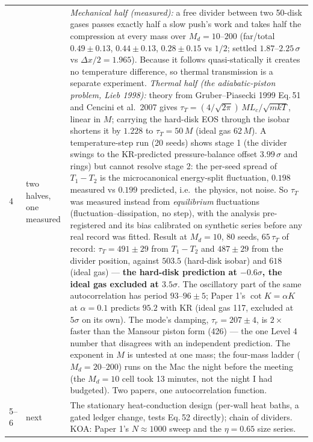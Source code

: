\documentclass[11pt,a4paper]{article}
\begin{document}
\begin{center}
\begin{tabular}{@{}lp{3.4cm}p{9.2cm}@{}}
4 & two halves, one measured & \emph{Mechanical half (measured):} a free divider between two 50-disk gases passes exactly half a slow push's work and takes half the compression at every mass over $M_d = 10$--$200$ (far/total $0.49 \pm 0.13$, $0.44 \pm 0.13$, $0.28 \pm 0.15$ vs $1/2$; settled $1.87$--$2.25\,\sigma$ vs $\Delta x/2 = 1.965$). Because it follows quasi-statically it creates no temperature difference, so thermal transmission is a separate experiment. \emph{Thermal half (the adiabatic-piston problem, Lieb 1998):} theory from Gruber--Piasecki 1999 Eq.\,51 and Cencini et al.\ 2007 gives $\tau_T = (4/\sqrt{2\pi})\,ML_c/\sqrt{mkT}$, linear in $M$; carrying the hard-disk EOS through the isobar shortens it by $1.228$ to $\tau_T = 50\,M$ (ideal gas $62\,M$). A temperature-step run (20 seeds) shows stage 1 (the divider swings to the KR-predicted pressure-balance offset $3.99\,\sigma$ and rings) but cannot resolve stage 2: the per-seed spread of $T_1 - T_2$ is the microcanonical energy-split fluctuation, $0.198$ measured vs $0.199$ predicted, i.e.\ the physics, not noise. So $\tau_T$ was measured instead from \emph{equilibrium} fluctuations (fluctuation--dissipation, no step), with the analysis pre-registered and its bias calibrated on synthetic series before any real record was fitted. Result at $M_d = 10$, 80 seeds, $65\,\tau_T$ of record: $\tau_T = 491 \pm 29$ from $T_1 - T_2$ and $487 \pm 29$ from the divider position, against $503.5$ (hard-disk isobar) and $618$ (ideal gas) --- \textbf{the hard-disk prediction at $-0.6\sigma$, the ideal gas excluded at $3.5\sigma$}. The oscillatory part of the same autocorrelation has period $93$--$96 \pm 5$; Paper 1's $\cot K = \alpha K$ at $\alpha = 0.1$ predicts $95.2$ with KR (ideal gas 117, excluded at $5\sigma$ on its own). The mode's damping, $\tau_r = 207 \pm 4$, is $2\times$ faster than the Mansour piston form (426) --- the one Level 4 number that disagrees with an independent prediction. The exponent in $M$ is untested at one mass; the four-mass ladder ($M_d = 20$--$200$) runs on the Mac the night before the meeting (the $M_d = 10$ cell took 13 minutes, not the night I had budgeted). Two papers, one autocorrelation function. \\
5--6 & next & The stationary heat-conduction design (per-wall heat baths, a gated ledger change, tests Eq.\,52 directly); chain of dividers. KOA: Paper 1's $N \approx 1000$ sweep and the $\eta = 0.65$ size series. \\
\bottomrule
\end{tabular}
\end{center}
\end{document}

